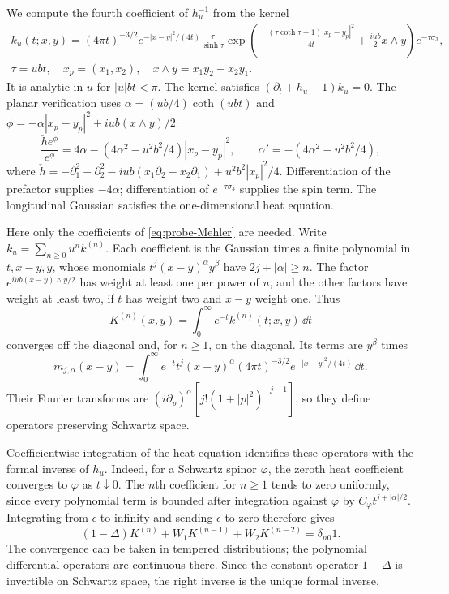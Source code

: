 We compute the fourth coefficient of $h_u^{-1}$ from the kernel
\begin{multline}\label{eq:probe-Mehler}
 k_u(t;x,y)=(4\pi t)^{-3/2}e^{-|x-y|^2/(4t)}
 \frac{\tau}{\sinh\tau}\exp\left(-\frac{(\tau\coth\tau-1)|x_p-y_p|^2}{4t}
                           +\frac{iub}{2}x\wedge y\right)
 e^{-\tau\sigma_3},\\
 \tau=ubt,\quad x_p=(x_1,x_2),\quad x\wedge y=x_1y_2-x_2y_1.
\end{multline}
It is analytic in $u$ for $|u|bt<\pi$. The kernel satisfies
$(\partial_t+h_u-1)k_u=0$. The planar verification uses
$\alpha=(ub/4)\coth(ubt)$ and
$\phi=-\alpha|x_p-y_p|^2+iub(x\wedge y)/2$:
\[
 \frac{\check h e^\phi}{e^\phi}
   =4\alpha-(4\alpha^2-u^2b^2/4)|x_p-y_p|^2,
 \qquad \alpha'=-(4\alpha^2-u^2b^2/4),
\]
where $\check h=-\partial_1^2-\partial_2^2
-iub(x_1\partial_2-x_2\partial_1)+u^2b^2|x_p|^2/4$.
Differentiation of the prefactor supplies $-4\alpha$; differentiation
of $e^{-\tau\sigma_3}$ supplies the spin term. The longitudinal
Gaussian satisfies the one-dimensional heat equation.

Here only the coefficients of \eqref{eq:probe-Mehler} are needed.
Write $k_u=\sum_{n\ge0}u^nk^{(n)}$. Each coefficient is the Gaussian
times a finite polynomial in $t,x-y,y$, whose monomials
$t^j(x-y)^\alpha y^\beta$ have $2j+|\alpha|\ge n$.
The factor $e^{iub(x-y)\wedge y/2}$ has weight at least one per
power of $u$, and the other factors have weight at least two,
if $t$ has weight two and $x-y$ weight one.
Thus
\[
 K^{(n)}(x,y)=\int_0^\infty e^{-t}k^{(n)}(t;x,y)\,\dd t
\]
converges off the diagonal and, for $n\ge1$, on the diagonal.
Its terms are $y^\beta$ times
\[
 m_{j,\alpha}(x-y)=\int_0^\infty e^{-t}t^j(x-y)^\alpha
                 (4\pi t)^{-3/2}e^{-|x-y|^2/(4t)}\,\dd t.
\]
Their Fourier transforms are
$(i\partial_p)^\alpha[j!(1+|p|^2)^{-j-1}]$, so they define
operators preserving Schwartz space.

Coefficientwise integration of the heat equation identifies these
operators with the formal inverse of $h_u$. Indeed, for a Schwartz
spinor $\varphi$, the zeroth heat coefficient converges to $\varphi$
as $t\downarrow0$. The $n$th coefficient for $n\ge1$ tends to zero
uniformly, since every polynomial term is bounded after integration
against $\varphi$ by $C_\varphi t^{j+|\alpha|/2}$.
Integrating from $\epsilon$ to infinity and sending $\epsilon$ to
zero therefore gives
\[
 (1-\Delta)K^{(n)}+W_1K^{(n-1)}+W_2K^{(n-2)}=\delta_{n0}1.
\]
The convergence can be taken in tempered distributions; the
polynomial differential operators are continuous there. Since the
constant operator $1-\Delta$ is invertible on Schwartz space, the
right inverse is the unique formal inverse.

